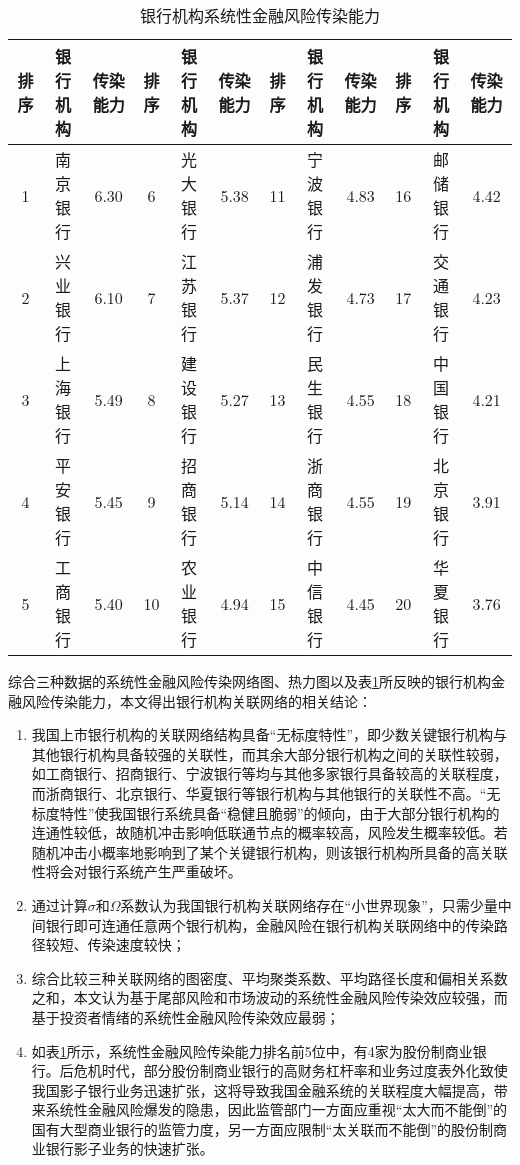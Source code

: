 \documentclass[lang=cn]{elegantpaper}
\begin{document}
\setlength{\tabcolsep}{5pt}
\begin{table}[htb]
    \centering
    \caption{银行机构系统性金融风险传染能力}
    \label{表8}
    \begin{tabular}{@{}cccccccccccc@{}}
    \toprule
    排序 & 银行机构 & 传染能力 & 排序 & 银行机构 & 传染能力 & 排序 & 银行机构 & 传染能力 & 排序 & 银行机构 & 传染能力 \\ \midrule
    1  & 南京银行 & 6.30 & 6  & 光大银行 & 5.38 & 11 & 宁波银行 & 4.83 & 16 & 邮储银行 & 4.42 \\
    2  & 兴业银行 & 6.10 & 7  & 江苏银行 & 5.37 & 12 & 浦发银行 & 4.73 & 17 & 交通银行 & 4.23 \\
    3  & 上海银行 & 5.49 & 8  & 建设银行 & 5.27 & 13 & 民生银行 & 4.55 & 18 & 中国银行 & 4.21 \\
    4  & 平安银行 & 5.45 & 9  & 招商银行 & 5.14 & 14 & 浙商银行 & 4.55 & 19 & 北京银行 & 3.91 \\
    5  & 工商银行 & 5.40 & 10 & 农业银行 & 4.94 & 15 & 中信银行 & 4.45 & 20 & 华夏银行 & 3.76 \\ \bottomrule
    \end{tabular}
\end{table}

综合三种数据的系统性金融风险传染网络图、热力图以及表\ref{表8}所反映的银行机构金融风险传染能力，本文得出银行机构关联网络的相关结论：
\begin{enumerate}
    \item 我国上市银行机构的关联网络结构具备“无标度特性”，即少数关键银行机构与其他银行机构具备较强的关联性，而其余大部分银行机构之间的关联性较弱，如工商银行、招商银行、宁波银行等均与其他多家银行具备较高的关联程度，而浙商银行、北京银行、华夏银行等银行机构与其他银行的关联性不高。“无标度特性”使我国银行系统具备“稳健且脆弱”的倾向，由于大部分银行机构的连通性较低，故随机冲击影响低联通节点的概率较高，风险发生概率较低。若随机冲击小概率地影响到了某个关键银行机构，则该银行机构所具备的高关联性将会对银行系统产生严重破坏。
    \item 通过计算$\sigma$和$\Omega$系数认为我国银行机构关联网络存在“小世界现象”，只需少量中间银行即可连通任意两个银行机构，金融风险在银行机构关联网络中的传染路径较短、传染速度较快；
    \item 综合比较三种关联网络的图密度、平均聚类系数、平均路径长度和偏相关系数之和，本文认为基于尾部风险和市场波动的系统性金融风险传染效应较强，而基于投资者情绪的系统性金融风险传染效应最弱；
    \item 如表\ref{表8}所示，系统性金融风险传染能力排名前5位中，有4家为股份制商业银行。后危机时代，部分股份制商业银行的高财务杠杆率和业务过度表外化致使我国影子银行业务迅速扩张，这将导致我国金融系统的关联程度大幅提高，带来系统性金融风险爆发的隐患，因此监管部门一方面应重视“太大而不能倒”的国有大型商业银行的监管力度，另一方面应限制“太关联而不能倒”的股份制商业银行影子业务的快速扩张。
\end{enumerate}
\end{document}
